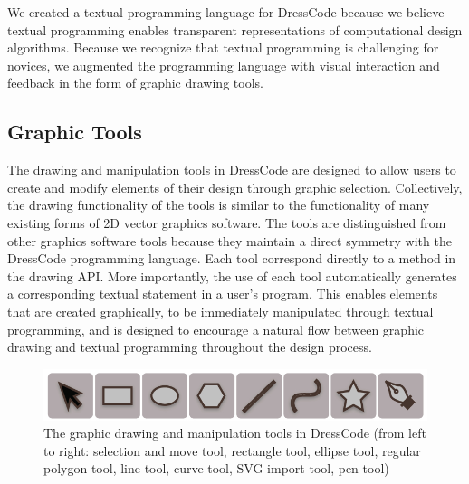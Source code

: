 \documentclass{sigchi}
\begin{document}
We created a textual programming language for DressCode because we believe textual programming enables transparent representations of computational design algorithms. Because we recognize that textual programming is challenging for novices, we augmented the programming language with visual interaction and feedback in the form of graphic drawing tools.
 
\subsection{Graphic Tools}
\label{subsec:graphic_tools_test}
The drawing and manipulation tools in DressCode are designed to allow users to create and modify elements of their design through graphic selection. Collectively, the drawing functionality of the tools is similar to the functionality of many existing forms of  2D vector graphics software. The tools are distinguished from other graphics software tools because they maintain a direct symmetry with the DressCode programming language. Each tool correspond directly to a method in the drawing API. More importantly, the use of each tool automatically generates a corresponding textual statement in a user's program. This enables elements that are created graphically, to be immediately manipulated through textual programming, and is designed to encourage a natural flow between graphic drawing and textual programming throughout the design process. 

\begin{center}
\begin{figure}[h!]
\includegraphics[width=\columnwidth]{images/graphic_tools.jpg}
\caption{The graphic drawing and manipulation tools in DressCode (from left to right: selection and move tool, rectangle tool, ellipse tool, regular polygon tool, line tool, curve tool, SVG import tool, pen tool)}
\label{fig:graphic_tools}
\end{figure}
\end{center}
\vspace{-20pt}
\end{document}
